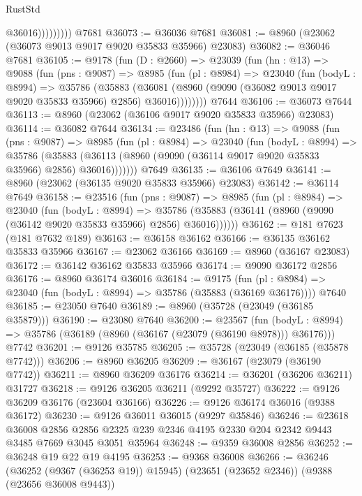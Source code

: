\begin{lexlean}{RustStd}
\begin{coremodule}
                      @36016)))))))))
    @7681
@36073 := @36036 @7681
@36081 := @8960 (@23062 (@36073 @9013 @9017 @9020 @35833 @35966) @23083)
@36082 := @36046 @7681
@36105 := @9178
    (fun (D : @2660) =>
    @23039
      (fun (hn : @13) =>
      @9088
        (fun (pns : @9087) =>
        @8985
          (fun (pl : @8984) =>
          @23040
            (fun (bodyL : @8994) =>
            @35786
              (@35883
                (@36081 (@8960 (@9090 (@36082 @9013 @9017 @9020 @35833 @35966) @2856) @36016))))))))
    @7644
@36106 := @36073 @7644
@36113 := @8960 (@23062 (@36106 @9017 @9020 @35833 @35966) @23083)
@36114 := @36082 @7644
@36134 := @23486
    (fun (hn : @13) =>
    @9088
      (fun (pns : @9087) =>
      @8985
        (fun (pl : @8984) =>
        @23040
          (fun (bodyL : @8994) =>
          @35786
            (@35883 (@36113 (@8960 (@9090 (@36114 @9017 @9020 @35833 @35966) @2856) @36016)))))))
    @7649
@36135 := @36106 @7649
@36141 := @8960 (@23062 (@36135 @9020 @35833 @35966) @23083)
@36142 := @36114 @7649
@36158 := @23516
    (fun (pns : @9087) =>
    @8985
      (fun (pl : @8984) =>
      @23040
        (fun (bodyL : @8994) =>
        @35786 (@35883 (@36141 (@8960 (@9090 (@36142 @9020 @35833 @35966) @2856) @36016))))))
@36162 := @181 @7623 (@181 @7632 @189)
@36163 := @36158 @36162
@36166 := @36135 @36162 @35833 @35966
@36167 := @23062 @36166
@36169 := @8960 (@36167 @23083)
@36172 := @36142 @36162 @35833 @35966
@36174 := @9090 @36172 @2856
@36176 := @8960 @36174 @36016
@36184 := @9175
    (fun (pl : @8984) => @23040 (fun (bodyL : @8994) => @35786 (@35883 (@36169 @36176))))
    @7640
@36185 := @23050 @7640
@36189 := @8960 (@35728 (@23049 (@36185 @35879)))
@36190 := @23080 @7640
@36200 := @23567
    (fun (bodyL : @8994) => @35786 (@36189 (@8960 (@36167 (@23079 (@36190 @8978))) @36176)))
    @7742
@36201 := @9126 @35785
@36205 := @35728 (@23049 (@36185 (@35878 @7742)))
@36206 := @8960 @36205
@36209 := @36167 (@23079 (@36190 @7742))
@36211 := @8960 @36209 @36176
@36214 := @36201 (@36206 @36211) @31727
@36218 := @9126 @36205 @36211 (@9292 @35727)
@36222 := @9126 @36209 @36176 (@23604 @36166)
@36226 := @9126 @36174 @36016 (@9388 @36172)
@36230 := @9126 @36011 @36015 (@9297 @35846)
@36246 := @23618
    @36008
    @2856
    @2856
    @2325
    @239
    @2346
    @4195
    @2330
    @204
    @2342
    @9443
    @3485
    @7669
    @3045
    @3051
    @35964
@36248 := @9359 @36008 @2856
@36252 := @36248 @19 @22 @19 @4195
@36253 := @9368 @36008
@36266 := @36246
    (@36252 (@9367 (@36253 @19)) @15945)
    (@23651 (@23652 @2346))
    (@9388 (@23656 @36008 @9443))

\end{coremodule}
\end{lexlean}

